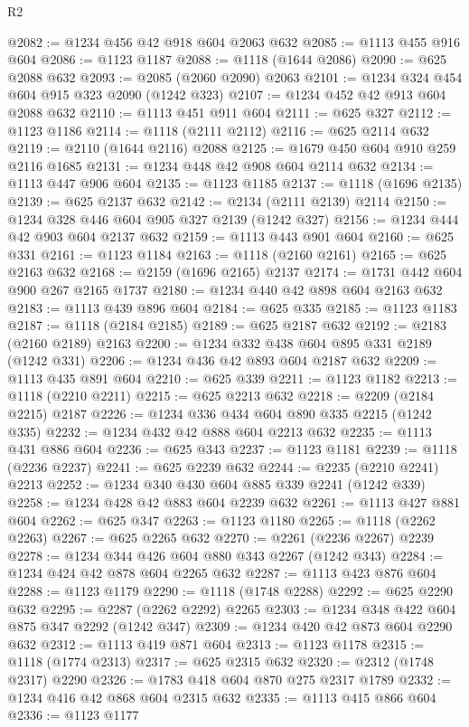 \begin{lexlean}{R2}
\begin{coremodule}
@2082 := @1234 @456 @42 @918 @604 @2063 @632
@2085 := @1113 @455 @916 @604
@2086 := @1123 @1187
@2088 := @1118 (@1644 @2086)
@2090 := @625 @2088 @632
@2093 := @2085 (@2060 @2090) @2063
@2101 := @1234 @324 @454 @604 @915 @323 @2090 (@1242 @323)
@2107 := @1234 @452 @42 @913 @604 @2088 @632
@2110 := @1113 @451 @911 @604
@2111 := @625 @327
@2112 := @1123 @1186
@2114 := @1118 (@2111 @2112)
@2116 := @625 @2114 @632
@2119 := @2110 (@1644 @2116) @2088
@2125 := @1679 @450 @604 @910 @259 @2116 @1685
@2131 := @1234 @448 @42 @908 @604 @2114 @632
@2134 := @1113 @447 @906 @604
@2135 := @1123 @1185
@2137 := @1118 (@1696 @2135)
@2139 := @625 @2137 @632
@2142 := @2134 (@2111 @2139) @2114
@2150 := @1234 @328 @446 @604 @905 @327 @2139 (@1242 @327)
@2156 := @1234 @444 @42 @903 @604 @2137 @632
@2159 := @1113 @443 @901 @604
@2160 := @625 @331
@2161 := @1123 @1184
@2163 := @1118 (@2160 @2161)
@2165 := @625 @2163 @632
@2168 := @2159 (@1696 @2165) @2137
@2174 := @1731 @442 @604 @900 @267 @2165 @1737
@2180 := @1234 @440 @42 @898 @604 @2163 @632
@2183 := @1113 @439 @896 @604
@2184 := @625 @335
@2185 := @1123 @1183
@2187 := @1118 (@2184 @2185)
@2189 := @625 @2187 @632
@2192 := @2183 (@2160 @2189) @2163
@2200 := @1234 @332 @438 @604 @895 @331 @2189 (@1242 @331)
@2206 := @1234 @436 @42 @893 @604 @2187 @632
@2209 := @1113 @435 @891 @604
@2210 := @625 @339
@2211 := @1123 @1182
@2213 := @1118 (@2210 @2211)
@2215 := @625 @2213 @632
@2218 := @2209 (@2184 @2215) @2187
@2226 := @1234 @336 @434 @604 @890 @335 @2215 (@1242 @335)
@2232 := @1234 @432 @42 @888 @604 @2213 @632
@2235 := @1113 @431 @886 @604
@2236 := @625 @343
@2237 := @1123 @1181
@2239 := @1118 (@2236 @2237)
@2241 := @625 @2239 @632
@2244 := @2235 (@2210 @2241) @2213
@2252 := @1234 @340 @430 @604 @885 @339 @2241 (@1242 @339)
@2258 := @1234 @428 @42 @883 @604 @2239 @632
@2261 := @1113 @427 @881 @604
@2262 := @625 @347
@2263 := @1123 @1180
@2265 := @1118 (@2262 @2263)
@2267 := @625 @2265 @632
@2270 := @2261 (@2236 @2267) @2239
@2278 := @1234 @344 @426 @604 @880 @343 @2267 (@1242 @343)
@2284 := @1234 @424 @42 @878 @604 @2265 @632
@2287 := @1113 @423 @876 @604
@2288 := @1123 @1179
@2290 := @1118 (@1748 @2288)
@2292 := @625 @2290 @632
@2295 := @2287 (@2262 @2292) @2265
@2303 := @1234 @348 @422 @604 @875 @347 @2292 (@1242 @347)
@2309 := @1234 @420 @42 @873 @604 @2290 @632
@2312 := @1113 @419 @871 @604
@2313 := @1123 @1178
@2315 := @1118 (@1774 @2313)
@2317 := @625 @2315 @632
@2320 := @2312 (@1748 @2317) @2290
@2326 := @1783 @418 @604 @870 @275 @2317 @1789
@2332 := @1234 @416 @42 @868 @604 @2315 @632
@2335 := @1113 @415 @866 @604
@2336 := @1123 @1177

\end{coremodule}
\end{lexlean}
